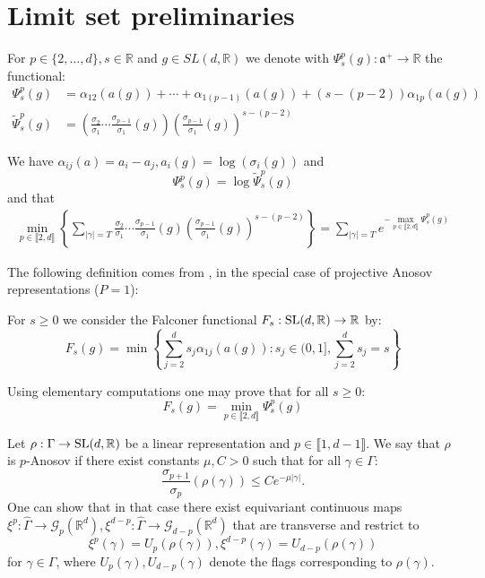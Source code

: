 \documentclass{report}
\begin{document}
\section{Limit set preliminaries}
\begin{definition}
For $p \in \{2, \ldots, d\}, s\in \mathbb R $
and $g \in SL(d, \mathbb R)$ 
we denote with $\Psi_s^p(g): \mathfrak a ^+ \to \mathbb R$ the functional:
\begin{align*}
\Psi_s^p(g) &= 
    \alpha_{12}(a(g)) + \cdots + \alpha_{1(p-1)}(a(g)) + (s - (p-2))\alpha_{1p}(a(g))\\
\tilde \Psi_s^p(g) &= 
    \left( \frac{\sigma_2}{\sigma_1}\cdots\frac{\sigma_{p-1}}{\sigma_1}(g)\right) 
    \left( \frac{\sigma_{p-1}}{\sigma_1}(g) \right)^{s - (p-2)}
\end{align*}
\end{definition}
\begin{remark}
    We have $\alpha_{ij}(a) = a_i - a_j, a_i(g) = \log (\sigma_i(g))$ and 
    \[
        \Psi_s^p(g) = \log \tilde \Psi_s^p(g)
    \]
and that
\begin{align*}
    \min_{p \in \llbracket 2, d \rrbracket} 
    \left\{ 
        \sum_{|\gamma| = T} 
            \frac{\sigma_2}{\sigma_1}\cdots\frac{\sigma_{p-1}}{\sigma_1}(g) 
            \left( \frac{\sigma_{p-1}}{\sigma_1}(g) \right)^{s - (p-2)}
    \right\} = 
    \sum_{|\gamma| = T} e^{-\max\limits_{p \in \llbracket 2, d \rrbracket} \Psi_s^p(g)}
\end{align*}
\end{remark}

The following definition comes from \cite{ledrappier_dimension_2023}, in the special case of projective Anosov representations ($P = {1}$):
\begin{definition}
    For $s \geq 0$ we consider the Falconer functional $F_s : \operatorname{{\mathrm{SL}}}(d, \mathbb R) \to \mathbb R$ by:
    \[
        F_s(g) = \min 
        \left\{
            \sum_{j=2}^d s_j \alpha_{1j}(a(g)) : s_j \in (0,1], \sum_{j=2}^d s_j = s 
        \right\}
    \]
\end{definition}

\begin{remark}
    Using elementary computations one may prove that for all $s \geq 0$:
    \[
        F_s(g) = \min_{p \in \llbracket 2, d \rrbracket} \Psi_s^p(g)
    \]
\end{remark}

\begin{definition}
Let $\rho: \Gamma \to \operatorname{{\mathrm{SL}}}(d, \mathbb R)$ be a linear representation and $p \in \llbracket 1, d-1 \rrbracket$.
We say that $\rho$ is $p$-Anosov if there exist constants $\mu, C>0$ such that for all $\gamma \in \Gamma$:
\[
    \frac{\sigma_{p+1}}{\sigma_p}(\rho(\gamma)) \leq C e^{-\mu |\gamma|}.
\]
One can show that in that case there exist equivariant continuous maps $\xi^p: \hat \Gamma \to \mathcal G_p(\mathbb R^d) , \xi^{d-p}: \hat \Gamma \to \mathcal G_{d-p}(\mathbb R^d)$ that are transverse and restrict to
\[
    \xi^p(\gamma) = U_p(\rho(\gamma)), \xi^{d-p}(\gamma) = U_{d-p}(\rho(\gamma))
\]
for $\gamma \in \Gamma$, where $U_p(\gamma), U_{d-p}(\gamma)$ denote the flags 
corresponding to  $\rho(\gamma)$.
\end{definition}
\end{document}
